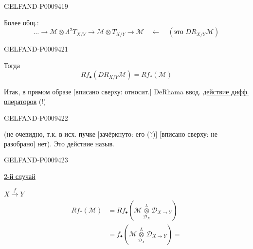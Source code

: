 \begin{GelfandAdjacentEvidence}{GELFAND-P000941}{9}


Более общ.: 
\begin{equation*}
 \ldots\longrightarrow\mathcal M\otimes\Lambda^2T_{X/Y}
 \longrightarrow\mathcal M\otimes T_{X/Y}\longrightarrow\mathcal M
 \quad\leftarrow\quad(\text{это }DR_{X/Y}\mathcal M)
 \tag{12}
\end{equation*}
\end{GelfandAdjacentEvidence}


\begin{GelfandAdjacentEvidence}{GELFAND-P000942}{1}

Тогда
\begin{equation*}
 Rf_\bullet(DR_{X/Y}\mathcal M)=Rf_*(\mathcal M)
 \tag{13}
\end{equation*}

Итак, в прямом образе [вписано сверху: относит.] DeRhama ввод. \underline{действие дифф. операторов} (!)
\end{GelfandAdjacentEvidence}
\begin{GelfandAdjacentEvidence}{GELFAND-P000942}{2}


(не очевидно, т.к. в исх. пучке [зачёркнуто: \sout{его} (?)] [вписано сверху: не разобрано] нет). Это действие назыв.
\end{GelfandAdjacentEvidence}
\begin{GelfandAdjacentEvidence}{GELFAND-P000942}{3}



\underline{2-й случай}

$X\overset f\longrightarrow Y$\qquad{}
\begin{equation*}
 \begin{aligned}
 Rf_*(\mathcal M)&=Rf_\bullet
 \left(\mathcal M\mathbin{\underset{\mathcal D_X}{\overset L\otimes}}\mathcal D_{X\to Y}\right)\\
 &=f_\bullet
 \left(\mathcal M\mathbin{\underset{\mathcal D_X}{\overset L\otimes}}\mathcal D_{X\to Y}\right)=
 \end{aligned}
 \tag{14}
\end{equation*}
\end{GelfandAdjacentEvidence}

